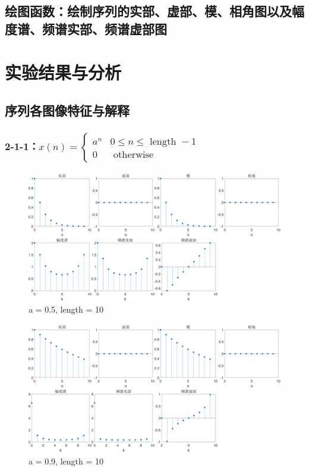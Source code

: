 \documentclass{../source/Experiment}
\begin{document}
\subsection{绘图函数：绘制序列的实部、虚部、模、相角图以及幅度谱、频谱实部、频谱虚部图}


\section{实验结果与分析}
\subsection{序列各图像特征与解释}

\subsubsection{2-1-1：$x(n)= \begin{cases}a^{n} & 0 \leq n \leq \text { length }-1 \\ 0 & \text { otherwise }\end{cases}$}

\begin{figure}[H]
    \centering
    \includegraphics[width = \textwidth]{src/2_1_1a}
    \caption{a = 0.5, length = 10}
\end{figure}

\begin{figure}[H]
    \centering
    \includegraphics[width = \textwidth]{src/2_1_1b}
    \caption{a = 0.9, length = 10}
\end{figure}
\end{document}

